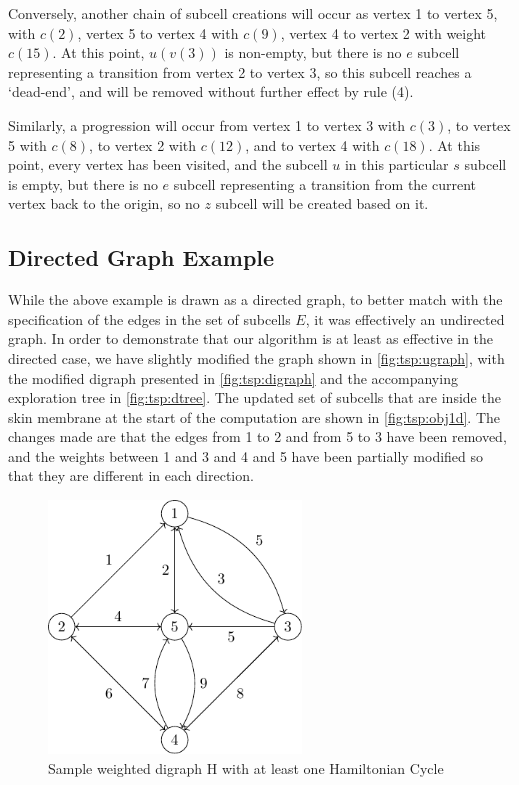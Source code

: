 Conversely, another chain of subcell creations will occur as vertex 1 to vertex 5, with \(c(2)\), vertex 5 to vertex 4 with \(c(9)\), vertex 4 to vertex 2 with weight \(c(15)\).  At this point, \(u(v(3))\) is non-empty, but there is no \(e\) subcell representing a transition from vertex 2 to vertex 3, so this subcell reaches a `dead-end', and will be removed without further effect by rule (4).

Similarly, a progression will occur from vertex 1 to vertex 3 with \(c(3)\), to vertex 5 with \(c(8)\), to vertex 2 with \(c(12)\), and to vertex 4 with \(c(18)\).  At this point, every vertex has been visited, and the subcell \(u\) in this particular \(s\) subcell is empty, but there is no \(e\) subcell representing a transition from the current vertex back to the origin, so no \(z\) subcell will be created based on it.


\subsection{Directed Graph Example}
While the above example is drawn as a directed graph, to better match with the specification of the edges in the set of subcells \(E\), it was effectively an undirected graph.  In order to demonstrate that our algorithm is at least as effective in the directed case, we have slightly modified the graph shown in \autoref{fig:tsp:ugraph}, with the modified digraph presented in \autoref{fig:tsp:digraph} and the accompanying exploration tree in \autoref{fig:tsp:dtree}.  The updated set of subcells that are inside the skin membrane at the start of the computation are shown in \autoref{fig:tsp:obj1d}.  The changes made are that the edges from 1 to 2 and from 5 to 3 have been removed, and the weights between 1 and 3 and 4 and 5 have been partially modified so that they are different in each direction.

\begin{figure}
\centering
\includegraphics[width=0.6\textwidth]{chapters/tsp/figs/ugraph-figure2}
\caption{\label{fig:tsp:digraph}Sample weighted digraph H with at least one Hamiltonian Cycle}
\end{figure}

